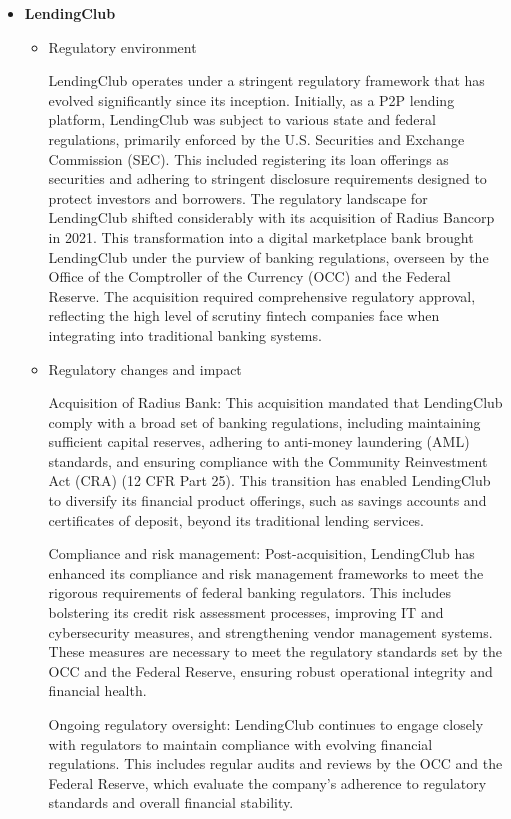 \documentclass{article}
\begin{document}
\begin{itemize}
    \item \textbf{LendingClub}
    \begin{itemize}
        \item Regulatory environment
        
        LendingClub operates under a stringent regulatory framework that has evolved significantly since its inception. Initially, as a P2P lending platform, LendingClub was subject to various state and federal regulations, primarily enforced by the U.S. Securities and Exchange Commission (SEC). This included registering its loan offerings as securities and adhering to stringent disclosure requirements designed to protect investors and borrowers.
        The regulatory landscape for LendingClub shifted considerably with its acquisition of Radius Bancorp in 2021. This transformation into a digital marketplace bank brought LendingClub under the purview of banking regulations, overseen by the Office of the Comptroller of the Currency (OCC) and the Federal Reserve. The acquisition required comprehensive regulatory approval, reflecting the high level of scrutiny fintech companies face when integrating into traditional banking systems.

        \item Regulatory changes and impact
        
        Acquisition of Radius Bank: This acquisition mandated that LendingClub comply with a broad set of banking regulations, including maintaining sufficient capital reserves, adhering to anti-money laundering (AML) standards, and ensuring compliance with the Community Reinvestment Act (CRA) (12 CFR Part 25). This transition has enabled LendingClub to diversify its financial product offerings, such as savings accounts and certificates of deposit, beyond its traditional lending services.
        
        Compliance and risk management: Post-acquisition, LendingClub has enhanced its compliance and risk management frameworks to meet the rigorous requirements of federal banking regulators. This includes bolstering its credit risk assessment processes, improving IT and cybersecurity measures, and strengthening vendor management systems. These measures are necessary to meet the regulatory standards set by the OCC and the Federal Reserve, ensuring robust operational integrity and financial health.
        
        Ongoing regulatory oversight: LendingClub continues to engage closely with regulators to maintain compliance with evolving financial regulations. This includes regular audits and reviews by the OCC and the Federal Reserve, which evaluate the company's adherence to regulatory standards and overall financial stability.
        

\end{itemize}
\end{itemize}
\end{document}
